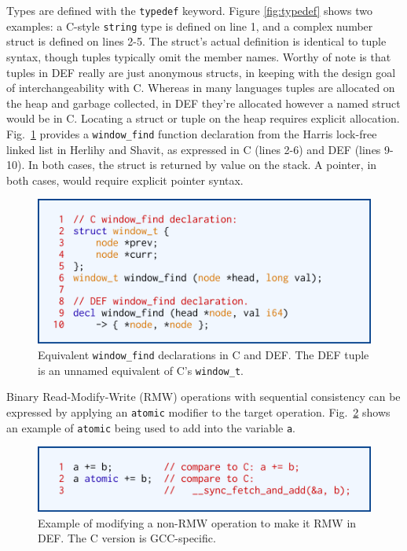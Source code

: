 Types are defined with the \texttt{typedef} keyword.  Figure \ref{fig:typedef} shows two examples: a C-style \texttt{string} type is defined on line 1, and a complex number struct is defined on lines 2-5.  The struct's actual definition is identical to tuple syntax, though tuples typically omit the member names.  Worthy of note is that tuples in DEF really are just anonymous structs, in keeping with the design goal of interchangeability with C.  Whereas in many languages tuples are allocated on the heap and garbage collected, in DEF they're allocated however a named struct would be in C.  Locating a struct or tuple on the heap requires explicit allocation.  Fig.~\ref{fig:window-find} provides a \texttt{window\_{}find} function declaration from the Harris lock-free linked list\cite{Harris} in Herlihy and Shavit,\cite{HSBook} as expressed in C (lines 2-6) and DEF (lines 9-10).  In both cases, the struct is returned by value on the stack.  A pointer, in both cases, would require explicit pointer syntax.

\begin{figure}[htbp!]
        \centering
        \includegraphics[scale=0.25]{gfx/window-find}
        \caption{Equivalent \texttt{window\_{}find} declarations in C and DEF.  The DEF tuple is an unnamed equivalent of C's \texttt{window\_{}t}.}
        \label{fig:window-find}
\end{figure}

Binary Read-Modify-Write (RMW) operations with sequential consistency can be expressed by applying an \texttt{atomic} modifier to the target operation.  Fig.~\ref{fig:atomic} shows an example of \texttt{atomic} being used to add into the variable \texttt{a}.


\begin{figure}[htbp!]
        \centering
        \includegraphics[scale=0.25]{gfx/atomic}
        \caption{Example of modifying a non-RMW operation to make it RMW in DEF.  The C version is GCC-specific.}
        \label{fig:atomic}
\end{figure}

